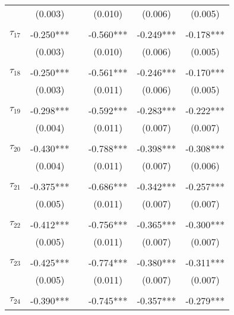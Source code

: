 \begin{tabular}{@{\extracolsep{-5pt}}lccccc}
                &  (0.003)  &&  (0.010)  &  (0.006)  &  (0.005)  \\
                &           &&           &           &           \\[-2.1ex]
$\tau_{17}$     & -0.250*** && -0.560*** & -0.249*** & -0.178*** \\
                &  (0.003)  &&  (0.010)  &  (0.006)  &  (0.005)  \\
                &           &&           &           &           \\[-2.1ex]
$\tau_{18}$     & -0.250*** && -0.561*** & -0.246*** & -0.170*** \\
                &  (0.003)  &&  (0.011)  &  (0.006)  &  (0.005)  \\
                &           &&           &           &           \\[-2.1ex]
$\tau_{19}$     & -0.298*** && -0.592*** & -0.283*** & -0.222*** \\
                &  (0.004)  &&  (0.011)  &  (0.007)  &  (0.007)  \\
                &           &&           &           &           \\[-2.1ex]
$\tau_{20}$     & -0.430*** && -0.788*** & -0.398*** & -0.308*** \\
                &  (0.004)  &&  (0.011)  &  (0.007)  &  (0.006)  \\
                &           &&           &           &           \\[-2.1ex]
$\tau_{21}$     & -0.375*** && -0.686*** & -0.342*** & -0.257*** \\
                &  (0.005)  &&  (0.011)  &  (0.007)  &  (0.007)  \\
                &           &&           &           &           \\[-2.1ex]
$\tau_{22}$     & -0.412*** && -0.756*** & -0.365*** & -0.300*** \\
                &  (0.005)  &&  (0.011)  &  (0.007)  &  (0.007)  \\
                &           &&           &           &           \\[-2.1ex]
$\tau_{23}$     & -0.425*** && -0.774*** & -0.380*** & -0.311*** \\
                &  (0.005)  &&  (0.011)  &  (0.007)  &  (0.007)  \\
                &           &&           &           &           \\[-2.1ex]
$\tau_{24}$     & -0.390*** && -0.745*** & -0.357*** & -0.279*** \\

\end{tabular}
